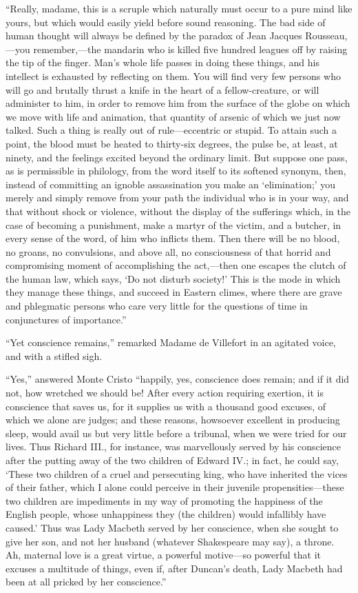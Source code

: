 “Really, madame, this is a scruple which naturally must occur to a pure
mind like yours, but which would easily yield before sound reasoning.
The bad side of human thought will always be defined by the paradox of
Jean Jacques Rousseau,—you remember,—the mandarin who is killed five
hundred leagues off by raising the tip of the finger. Man’s whole life
passes in doing these things, and his intellect is exhausted by
reflecting on them. You will find very few persons who will go and
brutally thrust a knife in the heart of a fellow-creature, or will
administer to him, in order to remove him from the surface of the globe
on which we move with life and animation, that quantity of arsenic of
which we just now talked. Such a thing is really out of rule—eccentric
or stupid. To attain such a point, the blood must be heated to
thirty-six degrees, the pulse be, at least, at ninety, and the feelings
excited beyond the ordinary limit. But suppose one pass, as is
permissible in philology, from the word itself to its softened synonym,
then, instead of committing an ignoble assassination you make an
‘elimination;’ you merely and simply remove from your path the
individual who is in your way, and that without shock or violence,
without the display of the sufferings which, in the case of becoming a
punishment, make a martyr of the victim, and a butcher, in every sense
of the word, of him who inflicts them. Then there will be no blood, no
groans, no convulsions, and above all, no consciousness of that horrid
and compromising moment of accomplishing the act,—then one escapes the
clutch of the human law, which says, ‘Do not disturb society!’ This is
the mode in which they manage these things, and succeed in Eastern
climes, where there are grave and phlegmatic persons who care very
little for the questions of time in conjunctures of importance.”

“Yet conscience remains,” remarked Madame de Villefort in an agitated
voice, and with a stifled sigh.

“Yes,” answered Monte Cristo “happily, yes, conscience does remain; and
if it did not, how wretched we should be! After every action requiring
exertion, it is conscience that saves us, for it supplies us with a
thousand good excuses, of which we alone are judges; and these reasons,
howsoever excellent in producing sleep, would avail us but very little
before a tribunal, when we were tried for our lives. Thus Richard III.,
for instance, was marvellously served by his conscience after the
putting away of the two children of Edward IV.; in fact, he could say,
‘These two children of a cruel and persecuting king, who have inherited
the vices of their father, which I alone could perceive in their
juvenile propensities—these two children are impediments in my way of
promoting the happiness of the English people, whose unhappiness they
(the children) would infallibly have caused.’ Thus was Lady Macbeth
served by her conscience, when she sought to give her son, and not her
husband (whatever Shakespeare may say), a throne. Ah, maternal love is
a great virtue, a powerful motive—so powerful that it excuses a
multitude of things, even if, after Duncan’s death, Lady Macbeth had
been at all pricked by her conscience.”

